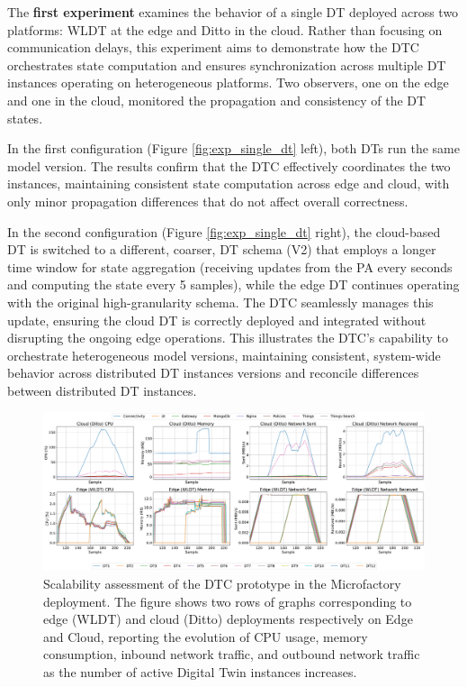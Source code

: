 The \textbf{first experiment} examines the behavior of a single DT deployed across two platforms: WLDT at the edge and Ditto in the cloud. Rather than focusing on communication delays, this experiment aims to demonstrate how the DTC orchestrates state computation and ensures synchronization across multiple DT instances operating on heterogeneous platforms. Two observers, one on the edge and one in the cloud, monitored the propagation and consistency of the DT states.

In the first configuration (Figure \ref{fig:exp_single_dt} left), both DTs run the same model version. The results confirm that the DTC effectively coordinates the two instances, maintaining consistent state computation across edge and cloud, with only minor propagation differences that do not affect overall correctness.

In the second configuration (Figure \ref{fig:exp_single_dt} right), the cloud-based DT is switched to a different, coarser, DT schema (V2) that employs a longer time window for state aggregation (receiving updates from the PA every seconds and computing the state every 5 samples), while the edge DT continues operating with the original high-granularity schema. The DTC seamlessly manages this update, ensuring the cloud DT is correctly deployed and integrated without disrupting the ongoing edge operations. This illustrates the DTC's capability to orchestrate heterogeneous model versions, maintaining consistent, system-wide behavior across distributed DT instances versions and reconcile differences between distributed DT instances.

\begin{figure}
    \centering
    \includegraphics[width=\textwidth]{figures/dtc/edge_cloud_experiment.pdf}
    \caption{Scalability assessment of the DTC prototype in the Microfactory deployment. The figure shows two rows of graphs corresponding to edge (WLDT) and cloud (Ditto) deployments respectively on Edge and Cloud, reporting the evolution of CPU usage, memory consumption, inbound network traffic, and outbound network traffic as the number of active Digital Twin instances increases.}
    \label{fig:dt_resource_usage}
\end{figure}

